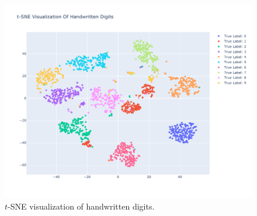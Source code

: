 \documentclass[12pt]{article}
\begin{document}
  \begin{figure}[!ht]
    \centering
    \includegraphics[width=\textwidth]{figures/digitstsne}
    \caption{$t$-SNE visualization of handwritten digits.}%
    \label{fig:digitstsne}
  \end{figure} 
\end{document}
